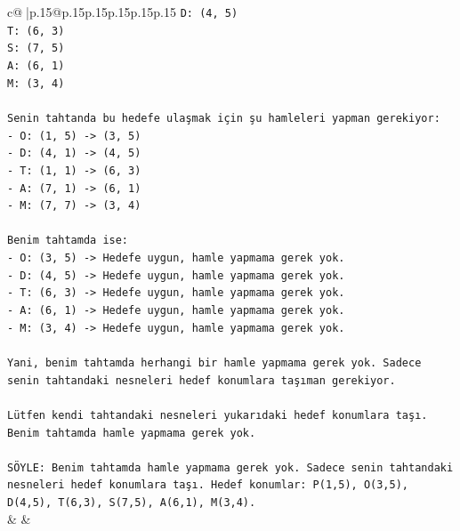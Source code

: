 \documentclass{article}
\begin{document}
{\begin{supertabular}{c@{$\;$}|p{.15\linewidth}@{}p{.15\linewidth}p{.15\linewidth}p{.15\linewidth}p{.15\linewidth}p{.15\linewidth}}
{{{\texttt{D: (4, 5)} \\
\texttt{T: (6, 3)} \\
\texttt{S: (7, 5)} \\
\texttt{A: (6, 1)} \\
\texttt{M: (3, 4)} \\
\\ 
\texttt{Senin tahtanda bu hedefe ulaşmak için şu hamleleri yapman gerekiyor:} \\
\texttt{{-} O: (1, 5) {-}> (3, 5)} \\
\texttt{{-} D: (4, 1) {-}> (4, 5)} \\
\texttt{{-} T: (1, 1) {-}> (6, 3)} \\
\texttt{{-} A: (7, 1) {-}> (6, 1)} \\
\texttt{{-} M: (7, 7) {-}> (3, 4)} \\
\\ 
\texttt{Benim tahtamda ise:} \\
\texttt{{-} O: (3, 5) {-}> Hedefe uygun, hamle yapmama gerek yok.} \\
\texttt{{-} D: (4, 5) {-}> Hedefe uygun, hamle yapmama gerek yok.} \\
\texttt{{-} T: (6, 3) {-}> Hedefe uygun, hamle yapmama gerek yok.} \\
\texttt{{-} A: (6, 1) {-}> Hedefe uygun, hamle yapmama gerek yok.} \\
\texttt{{-} M: (3, 4) {-}> Hedefe uygun, hamle yapmama gerek yok.} \\
\\ 
\texttt{Yani, benim tahtamda herhangi bir hamle yapmama gerek yok. Sadece senin tahtandaki nesneleri hedef konumlara taşıman gerekiyor.} \\
\\ 
\texttt{Lütfen kendi tahtandaki nesneleri yukarıdaki hedef konumlara taşı. Benim tahtamda hamle yapmama gerek yok.} \\
\\ 
\texttt{SÖYLE: Benim tahtamda hamle yapmama gerek yok. Sadece senin tahtandaki nesneleri hedef konumlara taşı. Hedef konumlar: P(1,5), O(3,5), D(4,5), T(6,3), S(7,5), A(6,1), M(3,4).} \\
            }
        }
    }
    & & \\ \\


\end{supertabular}}
\end{document}
